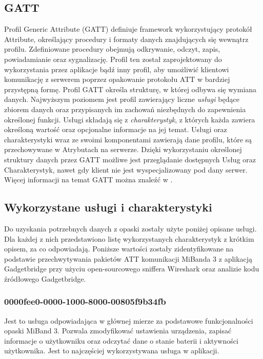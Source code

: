 \subsection{GATT}
Profil Generic Attribute (GATT) definiuje framework wykorzystujący protokół Attribute, określający procedury i formaty danych znajdujących się wewnątrz profilu. Zdefiniowane procedury obejmują odkrywanie, odczyt, zapis, powiadamianie oraz sygnalizację. Profil ten został zaprojektowany do wykorzystania przez aplikacje bądź inny profil, aby umożliwić klientowi komunikację z serwerem poprzez opakowanie protokołu ATT w bardziej przystępną formę.
\newline\newline
\indent Profil GATT określa strukturę, w której odbywa się wymiana danych. Najwyższym poziomem jest profil zawierający liczne \textit{usługi} będące zbiorem danych oraz przypisanych im zachowań niezbędnych do zapewnienia określonej funkcji. Usługi składają się z \textit{charakterystyk}, z których każda zawiera określoną wartość oraz opcjonalne informacje na jej temat. Usługi oraz charakterystyki wraz ze swoimi komponentami zawierają dane profilu, które są przechowywane w Atrybutach na serwerze. Dzięki wykorzystaniu określonej struktury danych przez GATT możliwe jest przeglądanie dostępnych Usług oraz Charakterystyk, nawet gdy klient nie jest wyspecjalizowany pod dany serwer. Więcej informacji na temat GATT można znaleźć w \cite{BT-Corev5.2}.

\subsection{Wykorzystane usługi i charakterystyki}
Do uzyskania potrzebnych danych z opaski zostały użyte poniżej opisane usługi. Dla każdej z nich przedstawiono listę wykorzystanych charakterystyk z krótkim opisem, za co odpowiadają. Poniższe wartości zostały zidentyfikowane na podstawie przechwytywania pakietów ATT komunikacji MiBanda 3 z aplikacją Gadgetbridge \cite{Gadgetbridge} przy użyciu open-sourcowego sniffera Wireshark \cite{Wireshark} oraz analizie kodu źródłowego Gadgetbridge.

\subsubsection{0000fee0-0000-1000-8000-00805f9b34fb}
Jest to usługa odpowiadająca w głównej mierze za podstawowe funkcjonalności opaski MiBand 3. Pozwala zmodyfikować ustawienia urządzenia, zapisać informacje o użytkowniku oraz odczytać dane o stanie baterii i aktywności użytkownika. Jest to najczęściej wykorzystywana usługa w aplikacji.

